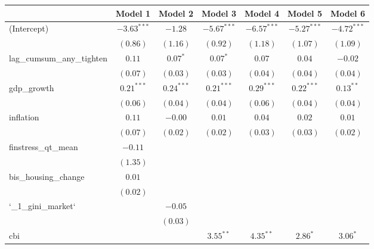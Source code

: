 
\begin{tabular}{l c c c c c c }
\hline
 & Model 1 & Model 2 & Model 3 & Model 4 & Model 5 & Model 6 \\
\hline
(Intercept)               & $-3.63^{***}$ & $-1.28$      & $-5.67^{***}$ & $-6.57^{***}$ & $-5.27^{***}$ & $-4.72^{***}$ \\
                          & $(0.86)$      & $(1.16)$     & $(0.92)$      & $(1.18)$      & $(1.07)$      & $(1.09)$      \\
lag\_cumsum\_any\_tighten & $0.11$        & $0.07^{*}$   & $0.07^{*}$    & $0.07$        & $0.04$        & $-0.02$       \\
                          & $(0.07)$      & $(0.03)$     & $(0.03)$      & $(0.04)$      & $(0.04)$      & $(0.04)$      \\
gdp\_growth               & $0.21^{***}$  & $0.24^{***}$ & $0.21^{***}$  & $0.29^{***}$  & $0.22^{***}$  & $0.13^{**}$   \\
                          & $(0.06)$      & $(0.04)$     & $(0.04)$      & $(0.06)$      & $(0.04)$      & $(0.04)$      \\
inflation                 & $0.11$        & $-0.00$      & $0.01$        & $0.04$        & $0.02$        & $0.01$        \\
                          & $(0.07)$      & $(0.02)$     & $(0.02)$      & $(0.03)$      & $(0.03)$      & $(0.02)$      \\
finstress\_qt\_mean       & $-0.11$       &              &               &               &               &               \\
                          & $(1.35)$      &              &               &               &               &               \\
bis\_housing\_change      & $0.01$        &              &               &               &               &               \\
                          & $(0.02)$      &              &               &               &               &               \\
`\_1\_gini\_market`       &               & $-0.05$      &               &               &               &               \\
                          &               & $(0.03)$     &               &               &               &               \\
cbi                       &               &              & $3.55^{**}$   & $4.35^{**}$   & $2.86^{*}$    & $3.06^{*}$    \\

\end{tabular}
